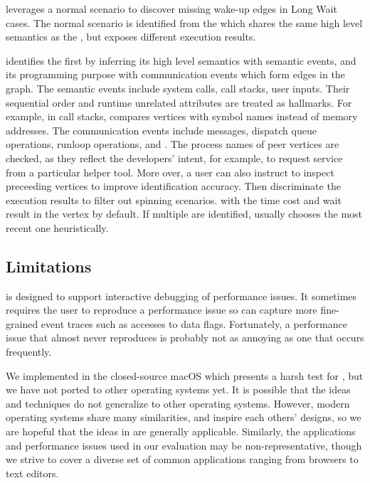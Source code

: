 \xxx leverages a normal scenario to discover missing wake-up edges in Long Wait
cases. The normal scenario is identified from the \similarnode which shares
the same high level semantics as the \spinningnode, but exposes different
execution results.

\xxx identifies the \similarnodes first by inferring its high level semantics
with semantic events, and its programming purpose with communication events
which form edges in the graph. The semantic events include system calls, call
stacks, user inputs. Their sequential order and runtime unrelated attributes
are treated as hallmarks. For example, in call stacks, \xxx compares vertices
with symbol names instead of memory addresses. The communication events include
messages, dispatch queue operations, runloop operations, \dataflagread and
\dataflagwrite. The process names of peer vertices are checked, as they reflect
the developers' intent, for example, to request service from a particular
helper tool. More over, a user can also instruct \xxx to inspect preceeding
vertices to improve identification accuracy. Then \xxx discriminate the
execution results to filter out spinning scenarios.  with the time cost and
wait result in the vertex by default. If multiple \similarnodes are identified,
\xxx usually chooses the most recent one heuristically.

\subsection{Limitations}

\xxx is designed to support interactive debugging of performance issues. It
sometimes requires the user to reproduce a performance issue so \xxx can capture
more fine-grained event traces such as accesses to data flags. Fortunately, a
performance issue that almost never reproduces is probably not as annoying as
one that occurs frequently.

We implemented \xxx in the closed-source macOS which presents a harsh test
for \xxx, but we have not ported \xxx to other operating systems yet. It is
possible that the ideas and techniques do not generalize to other operating
systems. However, modern operating systems share many similarities, and inspire
each others' designs, so we are hopeful that the ideas in \xxx are generally applicable.
Similarly, the applications and performance issues used in our
evaluation may be non-representative, though we strive to cover a diverse set of
common applications ranging from browsers to text editors.
